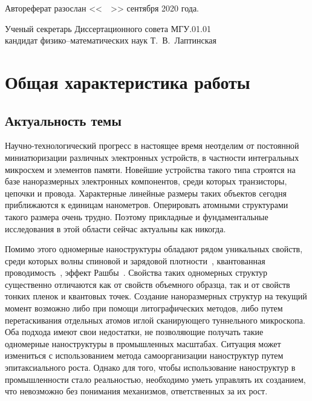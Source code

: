 \documentclass[10pt]{book}
\begin{document}
Автореферат разослан <<~\underline{\hspace*{0.7cm}}~>> сентября 2020 года.
\vfill

Ученый секретарь \hfill %
Диссертационного совета МГУ.01.01 \\
кандидат физико--математических наук \hfill Т.~В.~Лаптинская



\setlength{\parindent}{1em} \onehalfspacing
\newpage

\chapter{Общая характеристика работы}

\section{Актуальность темы}
Научно-технологический прогресс в настоящее время неотделим от постоянной миниатюризации различных электронных устройств, в частности интегральных микросхем и элементов памяти.
Новейшие устройства такого типа строятся на базе наноразмерных электронных компонентов, среди которых транзисторы, цепочки и провода. 
Характерные линейные размеры таких объектов сегодня приближаются к единицам нанометров. Оперировать атомными структурами такого размера очень трудно.
Поэтому прикладные и фундаментальные исследования в этой области сейчас актуальны как никогда.

Помимо этого одномерные наноструктуры обладают рядом уникальных свойств, среди которых волны спиновой и зарядовой плотности~\cite{Erwin2010}, квантованная проводимость~\cite{Klavsyuk2015}, эффект Рашбы~\cite{Rasba84.1}.
Свойства таких одномерных структур существенно отличаются как от свойств объемного образца, так и от свойств тонких пленок и квантовых точек.
Создание наноразмерных структур на текущий момент возможно либо при помощи литографических методов, либо путем перетаскивания отдельных атомов иглой сканирующего туннельного микроскопа.
Оба подхода имеют свои недостатки, не позволяющие получать такие одномерные наноструктуры в промышленных масштабах.
Ситуация может измениться с использованием метода самоорганизации наноструктур путем эпитаксиального роста.
Однако для того, чтобы использование наноструктур в промышленности стало реальностью, необходимо уметь управлять их созданием, что невозможно без понимания механизмов, ответственных за их рост.
\end{document}

